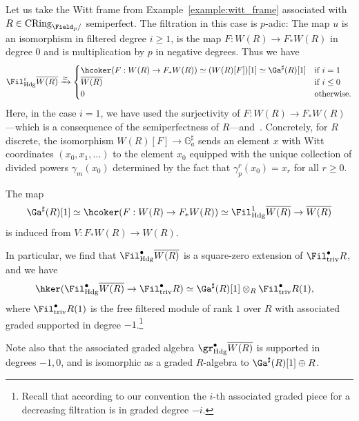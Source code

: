 \documentclass[10pt]{amsart}
\begin{document}
\begin{example}
\label{ex:u=0witt}
Let us take the Witt frame from Example~\ref{example:witt_frame} associated with $R\in \mathrm{CRing}_{\Field_p/}$ semiperfect. The filtration in this case is $p$-adic: The map $u$ is an isomorphism in filtered degree $i\ge 1$, is the map $F:W(R)\to F_*W(R)$ in degree $0$ and is multiplication by $p$ in negative degrees. Thus we have
\[
\Fil^i_{\mathrm{Hdg}}\overline{W(R)}\xrightarrow{\simeq} \begin{cases}
\hcoker(F:W(R)\to F_*W(R))\simeq (W(R)[F])[1]\simeq \Ga^\sharp(R)[1]&\text{if $i=1$}\\
\overline{W(R)}&\text{if $i\leq 0$}\\
0&\text{otherwise}.
\end{cases}
\]
Here, in the case $i=1$, we have used the surjectivity of $F:W(R)\to F_*W(R)$---which is a consequence of the semiperfectness of $R$---and~\cite[Variant 3.4.12]{bhatt2022absolute}. Concretely, for $R$ discrete, the isomorphism $W(R)[F]\to \mathbb{G}_a^\sharp$ sends an element $x$ with Witt coordinates $(x_0,x_1,\ldots)$ to the element $x_0$ equipped with the unique collection of divided powers $\gamma_m(x_0)$ determined by the fact that $\gamma_p^r(x_0) = x_r$ for all $r\ge 0$.

The map 
\[
\Ga^\sharp(R)[1]\simeq \hcoker(F:W(R)\to F_*W(R)) \simeq \Fil^1_{\mathrm{Hdg}}\overline{W(R)}\to \overline{W(R)}
\]
is induced from $V:F_*W(R)\to W(R)$. 

In particular, we find that $\Fil^\bullet_{\mathrm{Hdg}}\overline{W(R)}$ is a square-zero extension of $\Fil^\bullet_{\mathrm{triv}}R$, and we have
\begin{align*}
\hker(\Fil^\bullet_{\mathrm{Hdg}}\overline{W(R)}\to\Fil^\bullet_{\mathrm{triv}}R)&\simeq\Ga^\sharp(R)[1]\otimes_R\Fil^\bullet_{\mathrm{triv}}R(1),
\end{align*}
where $\Fil^\bullet_{\mathrm{triv}}R(1)$ is the free filtered module of rank $1$ over $R$ with associated graded supported in degree $-1$.\footnote{Recall that according to our convention the $i$-th associated graded piece for a decreasing filtration is in graded degree $-i$.}

Note also that the associated graded algebra $\gr^\bullet_{\mathrm{Hdg}}\overline{W(R)}$ is supported in degrees $-1,0$, and is isomorphic as a graded $R$-algebra to $\Ga^\sharp(R)[1]\oplus R$.
\end{example}  
\end{document}
